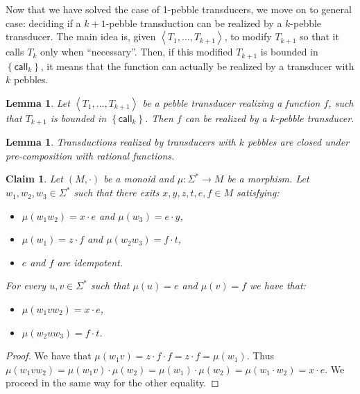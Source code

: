 \documentclass{article}
\newcommand{\set}[1]{\left\{#1 \right\}}
\newcommand{\atuple}[1]{\left\langle #1 \right\rangle}
\newcommand{\call}{\mathsf {call}}
\newtheorem{lemma}[theorem]{Lemma}
\newtheorem{claim}[theorem]{Claim}
\theoremstyle{definition}
\theoremstyle{remark}
\begin{document}
Now that we have solved the case of 1-pebble transducers, we move on to general case: deciding if a $k+1$-pebble transduction can be realized by a $k$-pebble transducer. The main idea is, given $\atuple{T_1,\ldots,T_{k+1}}$, to modify $T_{k+1}$ so that it calls $T_k$ only when ``necessary''. Then, if this modified $T_{k+1}$ is bounded in $\set{\call_k}$, it means that the function can actually be realized by a transducer with $k$ pebbles.



\begin{lemma} 
    \label{lem:bounded}
    Let $\atuple{T_1,\ldots,T_{k+1}}$ be a pebble transducer realizing a function $f$, such that $T_{k+1}$ is bounded in $\set{\call_k}$. Then $f$ can be realized by a $k$-pebble transducer.
\end{lemma}     


\begin{lemma}
    \label{lem:precomp}
    Transductions realized by transducers with $k$ pebbles are closed under pre-composition with rational functions.
\end{lemma}


\begin{claim}\label{claim:2idem}
Let $(M,\cdot)$ be a monoid and $\mu:\Sigma^*\to M$ be a morphism. Let $w_1,w_2, w_3\in\Sigma^*$ such that there exits $x,y,z,t,e,f\in M$ satisfying:
\begin{itemize}
\item $\mu(w_1w_2)=x\cdot e$ and $\mu(w_3)=e\cdot y$,
\item $\mu(w_1)=z\cdot f$ and $\mu(w_2w_3)=f\cdot t$,
\item $e$ and $f$ are idempotent.
\end{itemize}
For every $u, v\in\Sigma^*$ such that $\mu(u)=e$ and $\mu(v)=f$ we have that:
\begin{itemize}
\item $\mu(w_1vw_2)=x\cdot e$, 
\item $\mu(w_2uw_3)=f\cdot t$.
\end{itemize}
\end{claim}

\begin{proof}
We have that $\mu(w_1v)=z\cdot f\cdot f=z\cdot f=\mu(w_1)$.
Thus $\mu(w_1vw_2)=\mu(w_1v)\cdot \mu(w_2)=\mu(w_1)\cdot \mu(w_2)=\mu(w_1\cdot w_2) =x\cdot e$.
We proceed in the same way for the other equality.
\end{proof}
\end{document}
